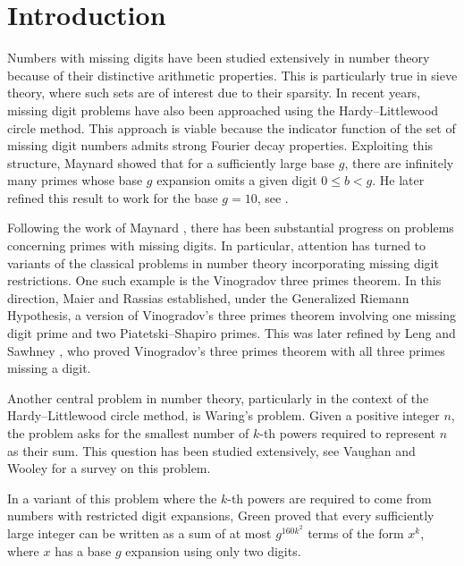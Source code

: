 \documentclass[12pt]{amsart}
\theoremstyle{definition}
\theoremstyle{definition}
\theoremstyle{remark}
\numberwithin{equation}{section}
\renewcommand{\leq}{\leqslant}
\begin{document}
\section{Introduction}
Numbers with missing digits have been studied extensively in number theory because of their distinctive arithmetic properties. This is particularly true in sieve theory, where such sets are of interest due to their sparsity. In recent years, missing digit problems have also been approached using the Hardy--Littlewood circle method. This approach is viable because the indicator function of the set of missing digit numbers admits strong Fourier decay properties. Exploiting this structure, Maynard \cite{MR4452438} showed that for a sufficiently large base $g$, there are infinitely many primes whose base $g$ expansion omits a given digit $0\leq b<g$. He later refined this result to work for the base $g=10$, see \cite{MR3958793}.

Following the work of Maynard \cite{MR4452438}, there has been substantial progress on problems concerning primes with missing digits. In particular, attention has turned to variants of the classical problems in number theory incorporating missing digit restrictions. One such example is the Vinogradov three primes theorem. In this direction, Maier and Rassias \cite{MR4546880} established, under the Generalized Riemann Hypothesis, a version of Vinogradov’s three primes theorem involving one missing digit prime and two Piatetski–Shapiro primes. This was later refined by Leng and Sawhney \cite{MR4855348}, who proved Vinogradov’s three primes theorem with all three primes missing a digit.

Another central problem in number theory, particularly in the context of the Hardy--Littlewood circle method, is Waring's problem. Given a positive integer $n$, the problem asks for the smallest number of $k$-th powers required to represent $n$ as their sum. This question has been studied extensively, see Vaughan and Wooley \cite{MR1956283} for a survey on this problem.

In a variant of this problem where the $k$-th powers are required to come from numbers with restricted digit expansions, Green \cite{MR4922764} proved that every sufficiently large integer can be written as a sum of at most $ g^{160k^2} $ terms of the form $x^k$, where $x$ has a base $g$ expansion using only two digits.
\end{document}
